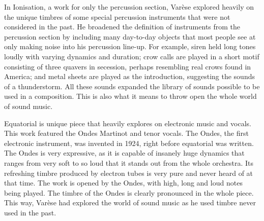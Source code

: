 \documentclass[a4paper]{article}
\begin{document}
In Ionisation, a work for only the percussion section, Varèse explored heavily
on the unique timbres of some special percussion instruments that were not
considered in the past. He broadened the definition of instruments from the
percussion section by including many day-to-day objects that most people see at
only making noise into his percussion line-up. For example, siren held long
tones loudly with varying dynamics and duration; crow calls are played in a
short motif consisting of three quavers in secession, perhaps resembling real
crows found in America; and metal sheets are played as the introduction,
suggesting the sounds of a thunderstorm. All these sounds expanded the library
of sounds possible to be used in a composition. This is also what it means to
throw open the whole world of sound music.

Equatorial is unique piece that heavily explores on electronic music and
vocals.  This work featured the Ondes Martinot and tenor vocals. The Ondes, the
first electronic instrument, was invented in 1924, right before equatorial was
written. The Ondes is very expressive, as it is capable of insanely huge
dynamics that ranges from very soft to so loud that it stands out from the
whole orchestra. Its refreshing timbre produced by electron tubes is very pure
and never heard of at that time. The work is opened by the Ondes, with high,
long and loud notes being played. The timbre of the Ondes is clearly pronounced
in the whole piece. This way, Varèse had explored the world of sound music as
he used timbre never used in the past.
\end{document}

